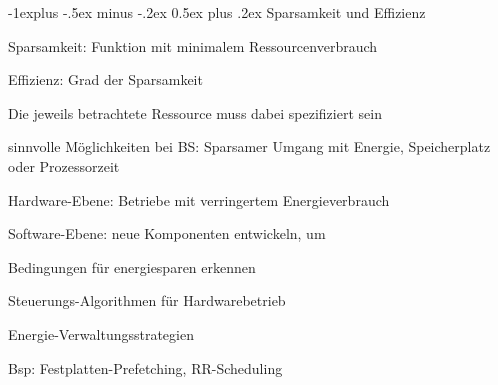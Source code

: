 \documentclass[a4paper]{article}
\makeatletter
\renewcommand{\subsection}{\@startsection{subsection}{2}{0mm}%
 {-1explus -.5ex minus -.2ex}%
 {0.5ex plus .2ex}%
 {\normalfont\normalsize\bfseries}}
\makeatother
\begin{document}
\begin{multicols}{3}
    \subsection{Sparsamkeit und Effizienz}
    \begin{itemize*}
        \item Sparsamkeit: Funktion mit minimalem Ressourcenverbrauch %
        \item Effizienz: Grad der Sparsamkeit %
        \item Die jeweils betrachtete Ressource muss dabei spezifiziert sein
        \item sinnvolle Möglichkeiten bei BS: Sparsamer Umgang mit Energie, Speicherplatz oder Prozessorzeit
    \end{itemize*}

    \begin{enumerate*}
        \item Hardware-Ebene: %
        Betriebe mit verringertem Energieverbrauch
        \item Software-Ebene: neue Komponenten entwickeln, um
        \begin{itemize*}
            \item Bedingungen für energiesparen erkennen
            \item Steuerungs-Algorithmen für Hardwarebetrieb%
            \item Energie-Verwaltungsstrategien%
            \item Bsp: Festplatten-Prefetching, RR-Scheduling
        \end{itemize*}
    \end{enumerate*}


\end{multicols}
\end{document}
